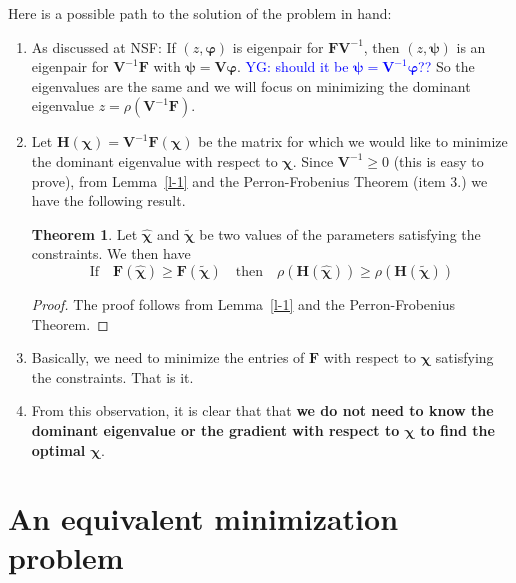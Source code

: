 \documentclass[12pt]{amsart}
\theoremstyle{definition}
\newtheorem{theorem}{Theorem}[section]
\begin{document}
Here is a possible path to the solution of the problem in hand:
\begin{enumerate}
\item As discussed at NSF: If $(z,\bm\varphi)$ is eigenpair for $\bm F\bm V^{-1}$, then $(z,\bm \psi)$ is 
an eigenpair for $\bm V^{-1}\bm F$ with $\bm \psi=\bm V\bm \varphi$. \textcolor{blue}{YG: should it be $\bm \psi=\bm V^{-1}\bm \varphi$??} So the eigenvalues are the same and we will focus on minimizing 
the dominant eigenvalue $z=\rho\left(\bm V^{-1} \bm F\right)$.  
\item Let $\bm H(\bm \chi)=\bm{V}^{-1}\bm F(\bm \chi)$ be the matrix for which we would like to minimize the dominant eigenvalue with respect to $\bm \chi$. Since $\bm V^{-1}\ge 0$ (this is easy to prove), from Lemma~\ref{l-1} and the Perron-Frobenius Theorem (item 3.) we have the following result.
\begin{theorem}
Let  $\widehat{\bm \chi}$ and $\widetilde{\bm \chi}$ be two values of the parameters satisfying the constraints. We then have
\begin{equation}\label{monotonicity} 
\mbox{If} \quad 
\bm F(\widehat{\bm\chi})\ge \bm F(\widetilde{\bm\chi})\quad\mbox{then}\quad
\rho\left(\bm H(\widehat{\bm\chi})\right) \ge \rho\left(\bm H(\widetilde{\bm\chi})\right) 
\end{equation}
\end{theorem}
\begin{proof}
The proof follows from Lemma~\ref{l-1} and the Perron-Frobenius Theorem.
\end{proof}
\item Basically, we need to minimize the entries of $\bm F$ with respect to $\bm{\chi}$ satisfying the constraints. That is it.
\item From this observation, it is clear that that {\bf we do not need to know the dominant eigenvalue or the gradient with respect to $\bm \chi$ to find the optimal $\bm \chi$}.
\end{enumerate}


\section{An equivalent minimization problem}
\end{document}
